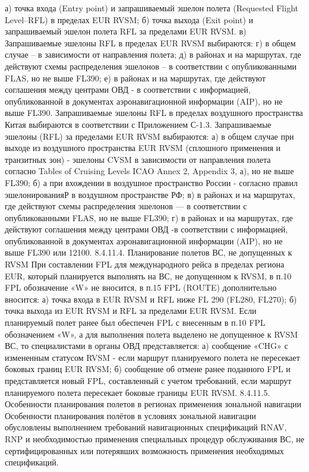 а)	точка входа (Entry point) и запрашиваемый эшелон полета (Requested Flight Level–RFL) в пределах EUR RVSM;
б)	точка выхода (Exit point) и запрашиваемый эшелон полета RFL за пределами EUR RVSM.
в)	Запрашиваемые эшелоны RFL в пределах EUR RVSM выбираются:
г)	в общем случае – в зависимости от направления полета;
д)	в районах и на маршрутах, где действуют схемы распределения эшелонов – в соответствии с опубликованными FLAS, но не выше FL390;
е)	в районах и на маршрутах, где действуют соглашения между центрами ОВД - в соответствии с информацией, опубликованной в документах аэронавигационной информации (AIP), но не выше FL390.
Запрашиваемые эшелоны RFL в пределах воздушного пространства Китая выбираются в соответствии с Приложением С-1.3.
Запрашиваемые эшелоны (RFL) за пределами EUR RVSM выбираются:
а)	в общем случае при выходе из воздушного пространства EUR RVSM (сплошного применения и транзитных зон) - эшелоны CVSM в зависимости от направления полета согласно Tables of Cruising Levels ICAO Annex 2, Appendix 3, а), но не выше FL390; 
б)	а при вхождении в воздушное пространство России - согласно правил эшелонированияР в воздушном пространстве РФ;
в)	в районах и на маршрутах, где действуют схемы распределения эшелонов — в соответствии с опубликованными FLAS, но не выше FL390;
г)	в районах и на маршрутах, где действуют соглашения между центрами ОВД -в соответствии с информацией, опубликованной в документах аэронавигационной информации (AIP), но не выше FL390 или 12100. 
8.4.11.4. Планирование полетов ВС, не допущенных к RVSM
При составлении FPL для международного рейса в пределах региона EUR, который планируется выполнять на ВС, не допущенном к RVSM, в п.10 FPL обозначение «W» не вносится, в п.15 FPL (ROUTE) дополнительно вносится: 
а)	точка входа в EUR RVSM и RFL ниже FL 290 (FL280, FL270);
б)	точка выхода из EUR RVSM и RFL за пределами EUR RVSM.
Если планируемый полет ранее был обеспечен FPL с внесенным в п.10 FPL обозначением «W», а для выполнения полета выделено не допущенное к RVSM ВС, то специалистами в органы ОВД представляется: 
а)	сообщение «CHG» с измененным статусом RVSM - если маршрут планируемого полета не пересекает боковых границ EUR RVSM; 
б)	сообщение об отмене ранее поданного FPL и представляется новый FPL, составленный с учетом требований, если маршрут планируемого полета пересекает боковые границы EUR RVSM. 
8.4.11.5. Особенности планирования полетов в регионах применения зональной навигации
Особенности планирования полётов в условиях зональной навигации обусловлены выполнением требований навигационных спецификаций RNAV, RNP и необходимостью применения специальных процедур обслуживания ВС, не сертифицированных или потерявших возможность применения необходимых спецификаций.
